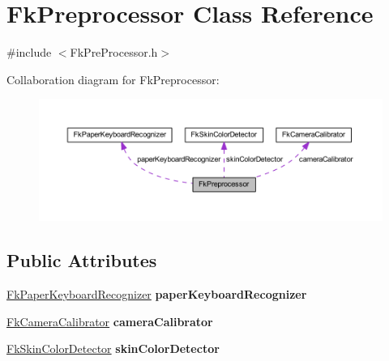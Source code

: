 \hypertarget{class_fk_preprocessor}{}\section{Fk\+Preprocessor Class Reference}
\label{class_fk_preprocessor}


{\ttfamily \#include $<$Fk\+Pre\+Processor.\+h$>$}



Collaboration diagram for Fk\+Preprocessor\+:
\nopagebreak
\begin{figure}[H]
\begin{center}
\leavevmode
\includegraphics[width=350pt]{class_fk_preprocessor__coll__graph}
\end{center}
\end{figure}
\subsection*{Public Attributes}
\begin{DoxyCompactItemize}
\item 
\hypertarget{class_fk_preprocessor_ab0cc51a9e36102c928e5a1a62b4204cb}{}\hyperlink{class_fk_paper_keyboard_recognizer}{Fk\+Paper\+Keyboard\+Recognizer} {\bfseries paper\+Keyboard\+Recognizer}\label{class_fk_preprocessor_ab0cc51a9e36102c928e5a1a62b4204cb}

\item 
\hypertarget{class_fk_preprocessor_aae22f7fe1260f67e5ea54e6f9ecf345f}{}\hyperlink{class_fk_camera_calibrator}{Fk\+Camera\+Calibrator} {\bfseries camera\+Calibrator}\label{class_fk_preprocessor_aae22f7fe1260f67e5ea54e6f9ecf345f}

\item 
\hypertarget{class_fk_preprocessor_a5bc133f42b182228ad50926a4da64a1e}{}\hyperlink{class_fk_skin_color_detector}{Fk\+Skin\+Color\+Detector} {\bfseries skin\+Color\+Detector}\label{class_fk_preprocessor_a5bc133f42b182228ad50926a4da64a1e}

\end{DoxyCompactItemize}


